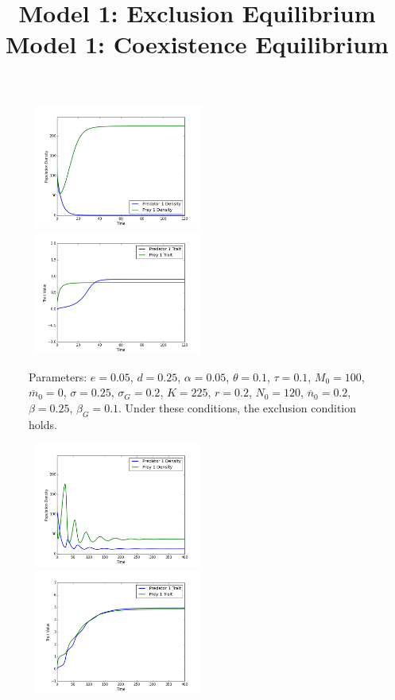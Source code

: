 \documentclass{amsart}
\theoremstyle{definition}
\theoremstyle{remark}
\numberwithin{equation}{section}
\begin{document}
\begin{centering}
	\begin{figure}
		\title{\bf Model 1: Exclusion Equilibrium\\}
		\includegraphics[width=6cm,height=4.1cm]{figures/1x1/constant_growth/densities_exclusion.png}
		\includegraphics[width=6cm,height=4.1cm]{figures/1x1/constant_growth/traits_exclusion.png}
		\caption{\footnotesize Parameters: $e = 0.05$, $d = 0.25$, $\alpha = 0.05$, $\theta = 0.1$, $\tau = 0.1$, $M_0 = 100$, $\overline{m}_0 = 0$, $\sigma = 0.25$, $\sigma_G = 0.2$, $K = 225$, $r = 0.2$, $N_0 = 120$, $\overline{n}_0 = 0.2$, $\beta = 0.25$, $\beta_G = 0.1$.  Under these conditions, the exclusion condition holds.}
		\label{fig:constant_growth_exclusion}
	\end{figure}
	\begin{figure}
		\title{\bf Model 1: Coexistence Equilibrium\\}
		\includegraphics[width=6cm,height=4.1cm]{figures/1x1/constant_growth/densities_stable_coexistence.png}
		\includegraphics[width=6cm,height=4.1cm]{figures/1x1/constant_growth/traits_stable_coexistence.png}

\end{figure}
\end{centering}
\end{document}
